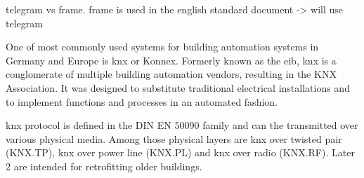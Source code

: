\alert{telegram vs frame. frame is used in the english standard document -> will use telegram}

One of most commonly used systems for building automation systems in Germany and Europe is \Gls{knx} or Konnex. Formerly known as the \gls{eib}, \gls{knx} is a \alert{conglomerate} of multiple building automation vendors, resulting in the KNX Association. 
It was designed to substitute traditional electrical installations and to implement functions and processes in an automated fashion. \parencite{Merz2009}

\Gls{knx} protocol is defined in the DIN EN 50090 family and can the transmitted over various physical media. Among those physical layers are \gls{knx} over twisted pair (KNX.TP), \gls{knx} over power line (KNX.PL) and \gls{knx} over radio (KNX.RF). Later 2 are intended for retrofitting older buildings. \parencite{Merz2009}

